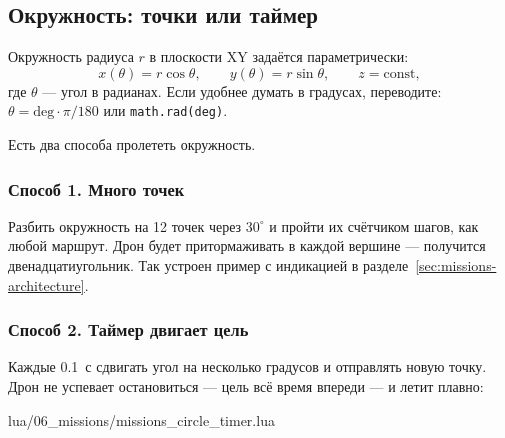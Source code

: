 \subsection{Окружность: точки или таймер}
\label{sec:missions-circle}

Окружность радиуса $r$ в плоскости XY задаётся параметрически:
\[
  x(\theta) = r\cos\theta,\qquad y(\theta) = r\sin\theta,\qquad z = \mathrm{const},
\]
где $\theta$ --- угол в радианах. Если удобнее думать в градусах, переводите: $\theta = \mathrm{deg}\cdot\pi/180$ или \verb|math.rad(deg)|.

Есть два способа пролететь окружность.

\subsubsection*{Способ 1. Много точек}

Разбить окружность на 12 точек через $30^\circ$ и пройти их счётчиком шагов, как любой маршрут. Дрон будет притормаживать в каждой вершине --- получится двенадцатиугольник. Так устроен пример с индикацией в разделе~\ref{sec:missions-architecture}.

\subsubsection*{Способ 2. Таймер двигает цель}

Каждые 0.1~с сдвигать угол на несколько градусов и отправлять новую точку. Дрон не успевает остановиться --- цель всё время впереди --- и летит плавно:

\begin{codefile}{lua/06_missions/missions_circle_timer.lua}
\end{codefile}

